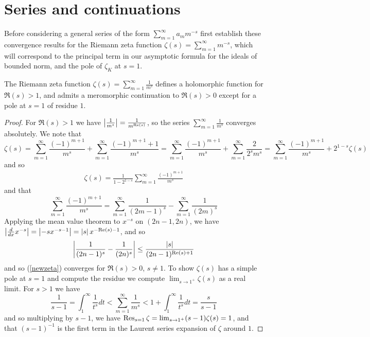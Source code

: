 \documentclass[11pt]{report}
\begin{document}
\section{Series and continuations} %
Before considering a general series of the form $\sum_{m = 1}^\infty a_mm^{-s}$ first establish these convergence results for the Riemann zeta function $\zeta(s) = \sum_{m = 1}^\infty m^{-s}$, which will correspond to the principal term in our asymptotic formula for the ideals of bounded norm, and the pole of $\zeta_K$ at $s = 1$.
\begin{lemma}
    The Riemann zeta function $\zeta(s) = \sum_{m = 1}^\infty \frac1{m^s}$ defines a holomorphic function for $\Re(s) > 1$, and admits a meromorphic continuation to $\Re(s) > 0$ except for a pole at $s = 1$ of residue $1$.
\end{lemma}
\begin{proof}
    For $\Re(s) > 1$ we have $\left| \frac1{m^s} \right| = \frac1{m^{\text{Re}(s)}}$, so the series $\sum_{m = 1}^\infty \frac1{m^s}$ converges absolutely. We note that 
    $$
        \zeta(s) = \sum_{m = 1}^\infty \frac{(-1)^{m + 1}}{m^s} + \sum_{m = 1}^\infty \frac{(-1)^{m + 1} + 1}{m^s} = \sum_{m = 1}^\infty \frac{(-1)^{m + 1}}{m^s} + \sum_{m = 1}^\infty \frac{2}{2^sm^s} = \sum_{m = 1}^\infty \frac{(-1)^{m + 1}}{m^s} + 2^{1 - s}\zeta(s)
    $$
    and so 
    \begin{align}\label{newzeta}
        \zeta(s) = \frac1{1 - 2^{1 - s}}\sum_{m = 1}^\infty \frac{(-1)^{m + 1}}{m^s}
    \end{align}    
    and that
    $$
        \sum_{m = 1}^\infty \frac{(-1)^{m + 1}}{m^s} = \sum_{m = 1}^\infty \frac{1}{(2m - 1)^s} - \sum_{m = 1}^\infty \frac{1}{(2m)^s}
    $$
    Applying the mean value theorem to $x^{-s}$ on $(2n - 1, 2n)$, we have $\left| \frac{d}{dx}x^{-s} \right| = \left| -sx^{-s - 1} \right| = \left| s \right|x^{-\text{Re}(s) - 1}$, and so
    $$
        \left| \frac1{(2n - 1)^s} - \frac1{(2n)^s} \right| \leq \frac{\left| s \right|}{(2n - 1)^{\text{Re}(s) + 1}}
    $$
    and so (\ref{newzeta}) converges for $\Re(s) > 0$, $s \neq 1$. To show $\zeta(s)$ has a simple pole at $s = 1$ and compute the residue we compute $\lim_{s \to 1^+}\zeta(s)$ as a real limit. For $s > 1$ we have
    $$
        \frac1{s - 1} = \int_1^\infty \frac1{t^s} dt < \sum_{m = 1}^\infty \frac1{m^s} < 1 + \int_1^\infty \frac1{t^s} dt = \frac{s}{s - 1}
    $$
    and so multiplying by $s - 1$, we have $\operatorname{Res}_{s = 1}\zeta = \lim_{s \to 1^+}(s - 1)\zeta(s) = 1$, and that $(s - 1)^{-1}$ is the first term in the Laurent series expansion of $\zeta$ around $1$.
\end{proof}
\end{document}
